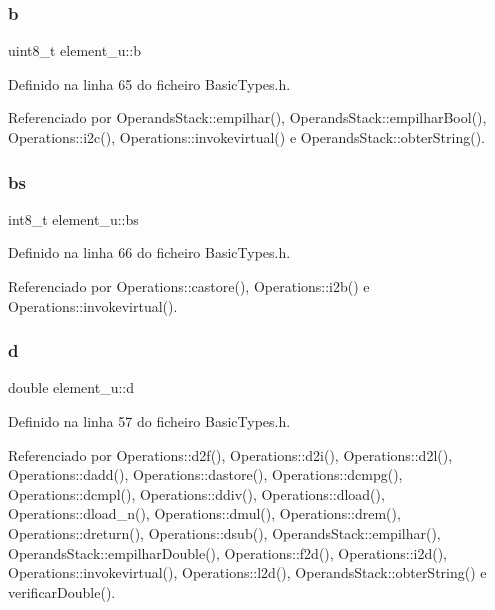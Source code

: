 \subsubsection{\texorpdfstring{b}{b}}
{\footnotesize\ttfamily uint8\+\_\+t element\+\_\+u\+::b}



Definido na linha 65 do ficheiro Basic\+Types.\+h.



Referenciado por Operands\+Stack\+::empilhar(), Operands\+Stack\+::empilhar\+Bool(), Operations\+::i2c(), Operations\+::invokevirtual() e Operands\+Stack\+::obter\+String().

\mbox{\label{unionelement__u_ae2cf2a77222a37a817fba0e70266ddf6}} 
\subsubsection{\texorpdfstring{bs}{bs}}
{\footnotesize\ttfamily int8\+\_\+t element\+\_\+u\+::bs}



Definido na linha 66 do ficheiro Basic\+Types.\+h.



Referenciado por Operations\+::castore(), Operations\+::i2b() e Operations\+::invokevirtual().

\mbox{\label{unionelement__u_a055cfbd7f84724337a2cb16acdedab90}} 
\subsubsection{\texorpdfstring{d}{d}}
{\footnotesize\ttfamily double element\+\_\+u\+::d}



Definido na linha 57 do ficheiro Basic\+Types.\+h.



Referenciado por Operations\+::d2f(), Operations\+::d2i(), Operations\+::d2l(), Operations\+::dadd(), Operations\+::dastore(), Operations\+::dcmpg(), Operations\+::dcmpl(), Operations\+::ddiv(), Operations\+::dload(), Operations\+::dload\+\_\+n(), Operations\+::dmul(), Operations\+::drem(), Operations\+::dreturn(), Operations\+::dsub(), Operands\+Stack\+::empilhar(), Operands\+Stack\+::empilhar\+Double(), Operations\+::f2d(), Operations\+::i2d(), Operations\+::invokevirtual(), Operations\+::l2d(), Operands\+Stack\+::obter\+String() e verificar\+Double().

